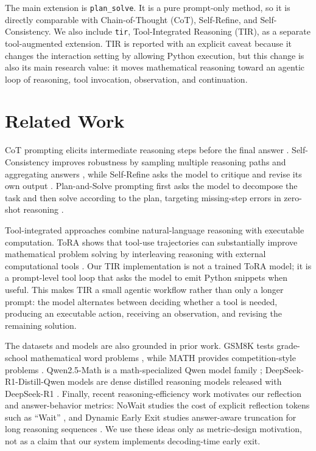 \documentclass[conference]{IEEEtran}
\begin{document}
The main extension is \texttt{plan\_solve}. It is a pure prompt-only method, so it is directly comparable with Chain-of-Thought (CoT), Self-Refine, and Self-Consistency. We also include \texttt{tir}, Tool-Integrated Reasoning (TIR), as a separate tool-augmented extension. TIR is reported with an explicit caveat because it changes the interaction setting by allowing Python execution, but this change is also its main research value: it moves mathematical reasoning toward an agentic loop of reasoning, tool invocation, observation, and continuation.

\section{Related Work}
CoT prompting elicits intermediate reasoning steps before the final answer \cite{wei2022cot}. Self-Consistency improves robustness by sampling multiple reasoning paths and aggregating answers \cite{wang2022selfconsistency}, while Self-Refine asks the model to critique and revise its own output \cite{madaan2024selfrefine}. Plan-and-Solve prompting first asks the model to decompose the task and then solve according to the plan, targeting missing-step errors in zero-shot reasoning \cite{wang2023plansolve}.

Tool-integrated approaches combine natural-language reasoning with executable computation. ToRA shows that tool-use trajectories can substantially improve mathematical problem solving by interleaving reasoning with external computational tools \cite{gou2023tora}. Our TIR implementation is not a trained ToRA model; it is a prompt-level tool loop that asks the model to emit Python snippets when useful. This makes TIR a small agentic workflow rather than only a longer prompt: the model alternates between deciding whether a tool is needed, producing an executable action, receiving an observation, and revising the remaining solution.

The datasets and models are also grounded in prior work. GSM8K tests grade-school mathematical word problems \cite{cobbe2021gsm8k}, while MATH provides competition-style problems \cite{hendrycks2021math}. Qwen2.5-Math is a math-specialized Qwen model family \cite{yang2024qwenmath}; DeepSeek-R1-Distill-Qwen models are dense distilled reasoning models released with DeepSeek-R1 \cite{deepseek2025r1}. Finally, recent reasoning-efficiency work motivates our reflection and answer-behavior metrics: NoWait studies the cost of explicit reflection tokens such as ``Wait'' \cite{wang2025nowait}, and Dynamic Early Exit studies answer-aware truncation for long reasoning sequences \cite{yang2025earlyexit}. We use these ideas only as metric-design motivation, not as a claim that our system implements decoding-time early exit.
\end{document}
